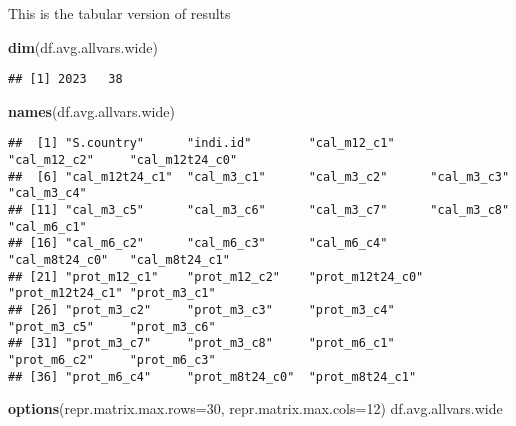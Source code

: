 \documentclass[
]{book}
\newenvironment{Shaded}{\begin{snugshade}}{\end{snugshade}}
\newcommand{\DataTypeTok}[1]{\textcolor[rgb]{0.13,0.29,0.53}{#1}}
\newcommand{\DecValTok}[1]{\textcolor[rgb]{0.00,0.00,0.81}{#1}}
\newcommand{\KeywordTok}[1]{\textcolor[rgb]{0.13,0.29,0.53}{\textbf{#1}}}
\newcommand{\NormalTok}[1]{#1}
\begin{document}
This is the tabular version of results

\begin{Shaded}
\begin{Highlighting}[]
\KeywordTok{dim}\NormalTok{(df.avg.allvars.wide)}
\end{Highlighting}
\end{Shaded}

\begin{verbatim}
## [1] 2023   38
\end{verbatim}

\begin{Shaded}
\begin{Highlighting}[]
\KeywordTok{names}\NormalTok{(df.avg.allvars.wide)}
\end{Highlighting}
\end{Shaded}

\begin{verbatim}
##  [1] "S.country"      "indi.id"        "cal_m12_c1"     "cal_m12_c2"     "cal_m12t24_c0" 
##  [6] "cal_m12t24_c1"  "cal_m3_c1"      "cal_m3_c2"      "cal_m3_c3"      "cal_m3_c4"     
## [11] "cal_m3_c5"      "cal_m3_c6"      "cal_m3_c7"      "cal_m3_c8"      "cal_m6_c1"     
## [16] "cal_m6_c2"      "cal_m6_c3"      "cal_m6_c4"      "cal_m8t24_c0"   "cal_m8t24_c1"  
## [21] "prot_m12_c1"    "prot_m12_c2"    "prot_m12t24_c0" "prot_m12t24_c1" "prot_m3_c1"    
## [26] "prot_m3_c2"     "prot_m3_c3"     "prot_m3_c4"     "prot_m3_c5"     "prot_m3_c6"    
## [31] "prot_m3_c7"     "prot_m3_c8"     "prot_m6_c1"     "prot_m6_c2"     "prot_m6_c3"    
## [36] "prot_m6_c4"     "prot_m8t24_c0"  "prot_m8t24_c1"
\end{verbatim}

\begin{Shaded}
\begin{Highlighting}[]
\KeywordTok{options}\NormalTok{(}\DataTypeTok{repr.matrix.max.rows=}\DecValTok{30}\NormalTok{, }\DataTypeTok{repr.matrix.max.cols=}\DecValTok{12}\NormalTok{)}
\NormalTok{df.avg.allvars.wide}
\end{Highlighting}
\end{Shaded}
\end{document}
